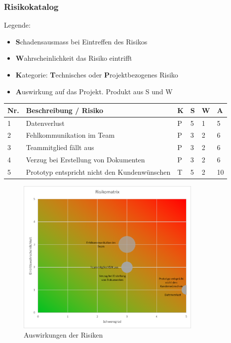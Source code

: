 \documentclass[a4paper]{scrreprt}
\begin{document}
\subsubsection{Risikokatalog}
\label{sssec:Risikokatalog}
Legende:
\begin{itemize}
	\item \textbf{S}chadensausmass bei Eintreffen des Risikos
	\item \textbf{W}ahrscheinlichkeit das Risiko eintrifft
	\item \textbf{K}ategorie: \textbf{T}echnisches oder \textbf{P}rojektbezogenes Risiko
	\item \textbf{A}uswirkung auf das Projekt. Produkt aus S und W
\end{itemize}

\vspace{1em}
\noindent
\begin{tabular}{|p{}|p{}|p{}|p{}|p{}||p{}|}
	\hline
	\textbf{Nr.} & \textbf{Beschreibung / Risiko} & \textbf{K} & \textbf{S} & \textbf{W} & \textbf{A} \\
	\hline
	1 & Datenverlust & P & 5 & 1 & 5\\
	\hline
	2 & Fehlkommunikation im Team & P & 3 & 2 & 6 \\
	\hline
	3 & Teammitglied fällt aus & P & 3 & 2 & 6 \\
	\hline
	4 & Verzug bei Erstellung von Dokumenten & P & 3 & 2 & 6 \\
	\hline
	5 & Prototyp entspricht nicht den Kundenwünschen & T & 5 & 2 & 10 \\
	\hline
\end{tabular}

\vspace{1em}

\begin{figure}[h!]
	\centering
	\includegraphics[keepaspectratio, width=0.8\textwidth]{RisikoMatrix}
	\caption{Auswirkungen der Risiken}
\end{figure}
\end{document}
